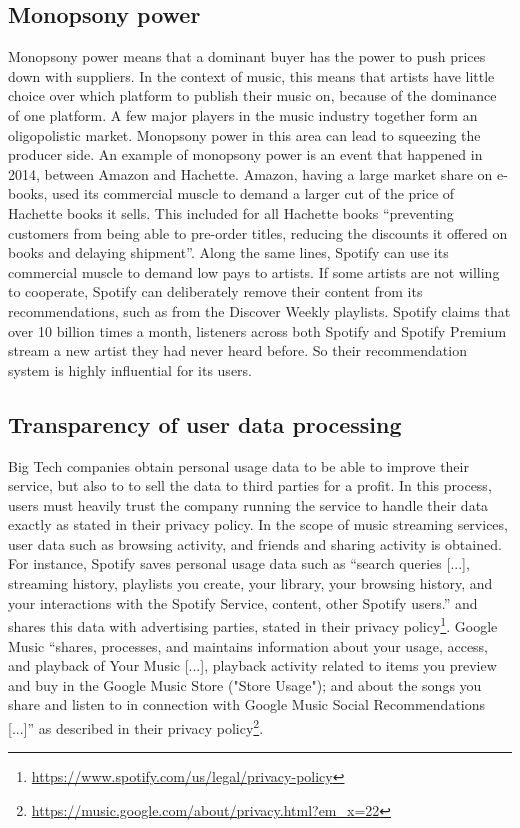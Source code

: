 \subsection{Monopsony power}
Monopsony power means that a dominant buyer has the power to push prices down with suppliers. In the context of music, this means that artists have little choice over which platform to publish their music on, because of the dominance of one platform. A few major players in the music industry together form an oligopolistic market. Monopsony power in this area can lead to squeezing the producer side. An example of monopsony power is an event that happened in 2014, between Amazon and Hachette. Amazon, having a large market share on e-books, used its commercial muscle to demand a larger cut of the price of Hachette books it sells. This included for all Hachette books ``preventing customers from being able to pre-order titles, reducing the discounts it offered on books and delaying shipment''\cite{theguardian2014amazon}. Along the same lines, Spotify can use its commercial muscle to demand low pays to artists. If some artists are not willing to cooperate, Spotify can deliberately remove their content from its recommendations, such as from the Discover Weekly playlists. Spotify claims that over 10 billion times a month, listeners across both Spotify and Spotify Premium stream a new artist they had never heard before. So their recommendation system is highly influential for its users.
\subsection{Transparency of user data processing}
Big Tech companies obtain personal usage data to be able to improve their service, but also to to sell the data to third parties for a profit. In this process, users must heavily trust the company running the service to handle their data exactly as stated in their privacy policy. In the scope of music streaming services, user data such as browsing activity, and friends and sharing activity is obtained. For instance, Spotify saves personal usage data such as ``search queries [...], streaming history, playlists you create, your library, your browsing history, and your interactions with the Spotify Service, content, other Spotify users.'' and shares this data with advertising parties, stated in their privacy policy\footnote{\url{https://www.spotify.com/us/legal/privacy-policy}}. Google Music ``shares, processes, and maintains information about your usage, access, and playback of Your Music [...], playback activity related to items you preview and buy in the Google Music Store ("Store Usage"); and about the songs you share and listen to in connection with Google Music Social Recommendations [...]'' as described in their privacy policy\footnote{\url{https://music.google.com/about/privacy.html?em_x=22}}. 

